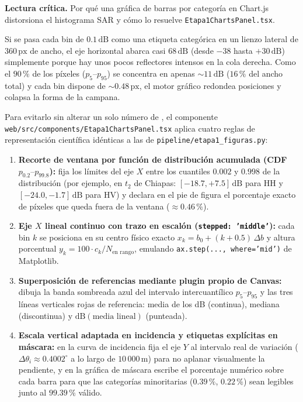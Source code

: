 \documentclass[11pt,a4paper]{article}
\newcommand{\src}[1]{\nolinkurl{#1}}
\newcommand{\unit}[1]{\mathrm{#1}}
\newcommand{\warn}[1]{\par\noindent\colorbox{blue!8}{\parbox{.965\linewidth}{\textbf{Lectura crítica.} #1}}\par}
\begin{document}
\begin{cuidado}
\warn{Por qué una gráfica de barras por categoría en Chart.js distorsiona el histograma SAR y cómo lo resuelve
\src{Etapa1ChartsPanel.tsx}.}
Si se pasa cada bin de $0.1\,\unit{dB}$ como una etiqueta categórica en un lienzo lateral de $360\,\unit{px}$ de
ancho, el eje horizontal abarca casi $68\,\unit{dB}$ (desde $-38$ hasta $+30\,\unit{dB}$) simplemente porque hay
unos pocos reflectores intensos en la cola derecha. Como el $90\,\text{\%}$ de los píxeles ($p_5\text{--}p_{95}$) se
concentra en apenas $\sim 11\,\unit{dB}$ ($16\,\text{\%}$ del ancho total) y cada bin dispone de $\sim 0.48\,\unit{px}$,
el motor gráfico redondea posiciones y colapsa la forma de la campana.

Para evitarlo sin alterar un solo número de , el componente \src{web/src/components/Etapa1ChartsPanel.tsx}
aplica cuatro reglas de representación científica idénticas a las de \src{pipeline/etapa1\_figuras.py}:
\begin{enumerate}
  \item \textbf{Recorte de ventana por función de distribución acumulada (CDF $p_{0.2}\text{--}p_{99.8}$):} fija
        los límites del eje $X$ entre los cuantiles $0.002$ y $0.998$ de la distribución (por ejemplo, en $t_2$
        de Chiapas: $[-18.7, +7.5]\,\unit{dB}$ para HH y $[-24.0, -1.7]\,\unit{dB}$ para HV) y declara en el pie
        de figura el porcentaje exacto de píxeles que queda fuera de la ventana ($\approx 0.46\,\text{\%}$).
  \item \textbf{Eje $X$ lineal continuo con trazo en escalón (\texttt{stepped: 'middle'}):} cada bin $k$ se
        posiciona en su centro físico exacto $x_k = b_0 + (k + 0.5)\,\Delta b$ y altura porcentual
        $y_k = 100 \cdot c_k / N_{\text{en rango}}$, emulando \texttt{ax.step(..., where='mid')} de Matplotlib.
  \item \textbf{Superposición de referencias mediante plugin propio de Canvas:} dibuja la banda sombreada azul
        del intervalo intercuantílico $p_5\text{--}p_{95}$ y las tres líneas verticales rojas de referencia:
        media de los dB (continua), mediana (discontinua) y $\text{dB}(\text{media lineal})$ (punteada).
  \item \textbf{Escala vertical adaptada en incidencia y etiquetas explícitas en máscara:} en la curva de
        incidencia fija el eje $Y$ al intervalo real de variación ($\Delta\theta_i \approx 0.4002^\circ$ a lo
        largo de $10\,000\,\unit{m}$) para no aplanar visualmente la pendiente, y en la gráfica de máscara
        escribe el porcentaje numérico sobre cada barra para que las categorías minoritarias ($0.39\,\text{\%}$,
        $0.22\,\text{\%}$) sean legibles junto al $99.39\,\text{\%}$ válido.
\end{enumerate}
\end{cuidado}
\end{document}
